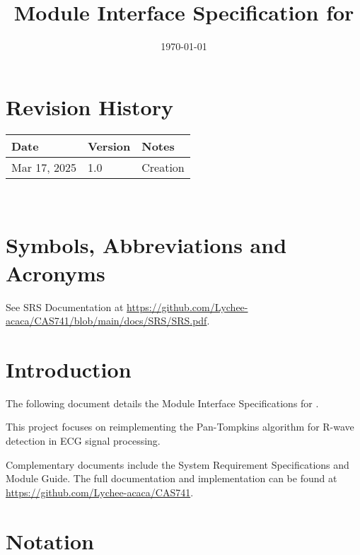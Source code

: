 \documentclass[12pt, titlepage]{article}
\begin{document}
\title{Module Interface Specification for \progname{}}

\author{\authname}

\date{\today}

\maketitle


\section{Revision History}

\begin{tabularx}{\textwidth}{p{3cm}p{2cm}X} \toprule {\bf Date} & {\bf Version}
& {\bf Notes}\\
\midrule
Mar 17, 2025 & 1.0 & Creation\\
\bottomrule
\end{tabularx}

~\newpage

\section{Symbols, Abbreviations and Acronyms}

See SRS Documentation at
\url{https://github.com/Lychee-acaca/CAS741/blob/main/docs/SRS/SRS.pdf}.


\newpage

\tableofcontents

\newpage


\section{Introduction}

The following document details the Module Interface Specifications for
\progname.

This project focuses on reimplementing the Pan-Tompkins algorithm for R-wave
detection in ECG signal processing.

Complementary documents include the System Requirement Specifications and Module
Guide.  The full documentation and implementation can be found at
\url{https://github.com/Lychee-acaca/CAS741}.

\section{Notation}
\end{document}
